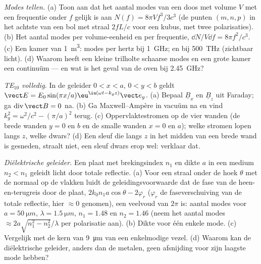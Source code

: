 \begin{exercise}[$\star\star$]\label{exo:b2:guided-waves:9}
\emph{Modes tellen.} (a) Toon aan dat het aantal modes van een doos met
volume $V$ met een frequentie onder $f$ gelijk is aan
$N(f) = 8\pi Vf^3/3c^3$ (de punten $(m, n, p)$ in het achtste van een bol
met straal $2fL/c$ voor een kubus, met twee polarisaties). (b) Het aantal
modes per volume-eenheid en per frequentie, $\dd N/V\dd f = 8\pi f^2/c^3$.
(c) Een kamer van \qty{1}{m^3}: modes per hertz bij \qty{1}{GHz}; en bij
\qty{500}{THz} (zichtbaar licht). (d) Waarom heeft een kleine trilholte
schaarse modes en een grote kamer een continuüm --- en wat is het geval van
de oven bij \qty{2.45}{GHz}?
\end{exercise}

\begin{exercise}[$\star\star\star$]\label{exo:b2:guided-waves:10}
\emph{TE$_{10}$ volledig.} In de geleider $0 < x < a$, $0 < y < b$ geldt
$\vect E =
E_0\sin(\pi x/a)\eu^{\iu(\omega t - k_gz)}\vect e_y$. (a) Bepaal
$\underline B_x$ en $\underline B_z$ uit Faraday; ga
$\operatorname{div}\vect B = 0$ na. (b) Ga Maxwell--Ampère in vacuüm na en
vind $k_g^2 = \omega^2/c^2 - (\pi/a)^2$ terug. (c) Oppervlaktestromen op de
vier wanden (de brede wanden $y = 0$ en $b$ en de smalle wanden $x = 0$ en
$a$); welke stromen lopen langs $z$, welke dwars? (d) Een sleuf die langs
$z$ in het midden van een brede wand is gesneden, straalt niet, een sleuf
dwars erop wel: verklaar dat.
\end{exercise}

\begin{exercise}[$\star\star\star$]\label{exo:b2:guided-waves:11}
\emph{Diëlektrische geleider.} Een plaat met brekingsindex $n_1$ en dikte
$a$ in een medium $n_2 < n_1$ geleidt licht door totale reflectie. (a) Voor
een straal onder de hoek $\theta$ met de normaal op de vlakken luidt de
geleidingsvoorwaarde dat de fase van de heen-en-terugreis door de plaat,
$2k_0n_1a\cos\theta - 2\varphi_r$ ($\varphi_r$ de faseverschuiving van de
totale reflectie, hier $\approx 0$ genomen), een veelvoud van $2\pi$ is:
aantal modes voor $a = \qty{50}{\micro m}$, $\lambda = \qty{1.5}{\micro m}$,
$n_1 = 1.48$ en $n_2 = 1.46$ (neem het aantal modes
$\approx 2a\sqrt{n_1^2 - n_2^2}/\lambda$ per polarisatie aan). (b) Dikte
voor één enkele mode. (c) Vergelijk met de kern van \qty{9}{\micro m} van
een enkelmodige vezel. (d) Waarom kan de diëlektrische geleider, anders dan
de metalen, geen afsnijding voor zijn laagste mode hebben?
\end{exercise}

